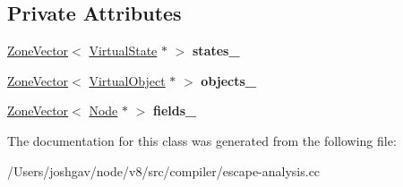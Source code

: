 \subsection*{Private Attributes}
\begin{DoxyCompactItemize}
\item 
\hyperlink{classv8_1_1internal_1_1_zone_vector}{Zone\+Vector}$<$ \hyperlink{classv8_1_1internal_1_1compiler_1_1_virtual_state}{Virtual\+State} $\ast$ $>$ {\bfseries states\+\_\+}\hypertarget{classv8_1_1internal_1_1compiler_1_1_merge_cache_a67892092f24367d0b32488029e77e026}{}\label{classv8_1_1internal_1_1compiler_1_1_merge_cache_a67892092f24367d0b32488029e77e026}

\item 
\hyperlink{classv8_1_1internal_1_1_zone_vector}{Zone\+Vector}$<$ \hyperlink{classv8_1_1internal_1_1compiler_1_1_virtual_object}{Virtual\+Object} $\ast$ $>$ {\bfseries objects\+\_\+}\hypertarget{classv8_1_1internal_1_1compiler_1_1_merge_cache_a271ce38664cad053d6d6d0effb789fb5}{}\label{classv8_1_1internal_1_1compiler_1_1_merge_cache_a271ce38664cad053d6d6d0effb789fb5}

\item 
\hyperlink{classv8_1_1internal_1_1_zone_vector}{Zone\+Vector}$<$ \hyperlink{classv8_1_1internal_1_1compiler_1_1_node}{Node} $\ast$ $>$ {\bfseries fields\+\_\+}\hypertarget{classv8_1_1internal_1_1compiler_1_1_merge_cache_a4b32775e5f643f3fba8116f9fec18f5a}{}\label{classv8_1_1internal_1_1compiler_1_1_merge_cache_a4b32775e5f643f3fba8116f9fec18f5a}

\end{DoxyCompactItemize}


The documentation for this class was generated from the following file\+:\begin{DoxyCompactItemize}
\item 
/\+Users/joshgav/node/v8/src/compiler/escape-\/analysis.\+cc\end{DoxyCompactItemize}
